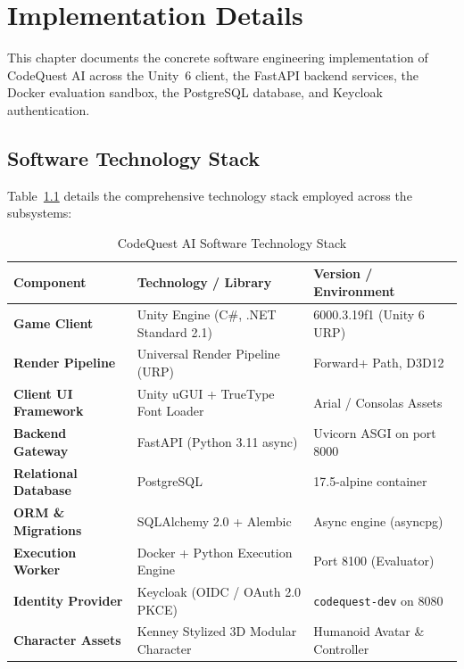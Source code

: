 \chapter{Implementation Details}
\label{ch:implementation}

This chapter documents the concrete software engineering implementation of CodeQuest AI across the Unity~6 client, the FastAPI backend services, the Docker evaluation sandbox, the PostgreSQL database, and Keycloak authentication.

\section{Software Technology Stack}
Table~\ref{tab:tech_stack} details the comprehensive technology stack employed across the subsystems:

\begin{table}[htbp]
\centering
\small
\renewcommand{\arraystretch}{1.25}
\caption{CodeQuest AI Software Technology Stack}
\label{tab:tech_stack}
\begin{tabularx}{\textwidth}{|p{}|p{}|X|}
\hline
\rowcolor{gray!25}\textbf{Component} & \textbf{Technology / Library} & \textbf{Version / Environment} \\ \hline
\textbf{Game Client} & Unity Engine (C\#, .NET Standard 2.1) & 6000.3.19f1 (Unity 6 URP) \\ \hline
\textbf{Render Pipeline} & Universal Render Pipeline (URP) & Forward+ Path, D3D12 \\ \hline
\textbf{Client UI Framework} & Unity uGUI + TrueType Font Loader & Arial / Consolas Assets \\ \hline
\textbf{Backend Gateway} & FastAPI (Python 3.11 async) & Uvicorn ASGI on port 8000 \\ \hline
\textbf{Relational Database} & PostgreSQL & 17.5-alpine container \\ \hline
\textbf{ORM \& Migrations} & SQLAlchemy 2.0 + Alembic & Async engine (asyncpg) \\ \hline
\textbf{Execution Worker} & Docker + Python Execution Engine & Port 8100 (Evaluator) \\ \hline
\textbf{Identity Provider} & Keycloak (OIDC / OAuth 2.0 PKCE) & \texttt{codequest-dev} on 8080 \\ \hline
\textbf{Character Assets} & Kenney Stylized 3D Modular Character & Humanoid Avatar \& Controller \\ \hline
\end{tabularx}
\end{table}

